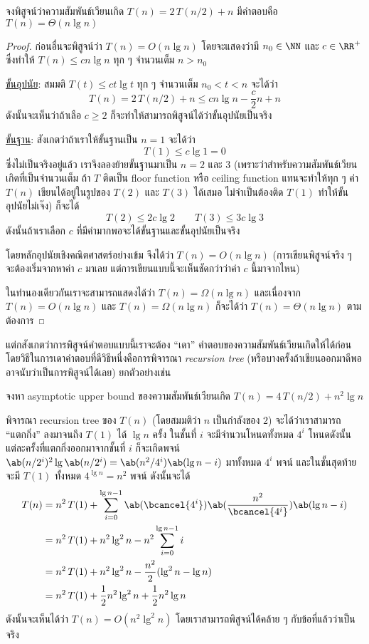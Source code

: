 \begin{exbox}
	จงพิสูจน์ว่าความสัมพันธ์เวียนเกิด $T(n) = 2\, T(n/2) + n$ มีคำตอบคือ $T(n) = \Theta(n\lg n)$
\end{exbox}
\begin{proof}
	ก่อนอื่นจะพิสูจน์ว่า $T(n) = O(n\lg n)$ โดยจะแสดงว่ามี $n_0 \in \NN$ และ $c \in \RR^+$ ซึ่งทำให้ $T(n) \leq cn\lg n$ ทุก ๆ จำนวนเต็ม $n > n_0$
	
	\underline{ขั้นอุปนัย}: สมมติ $T(t) \leq ct\lg t$ ทุก ๆ จำนวนเต็ม $n_0 < t < n$ จะได้ว่า
	\[
		T(n) = 2\,T(n/2) + n \leq cn\lg n - \frac{c}{2}n + n
	\]
	ดังนั้นจะเห็นว่าถ้าเลือ $c \geq 2$ ก็จะทำให้สามารถพิสูจน์ได้ว่าขั้นอุปนัยเป็นจริง
	
	\underline{ขั้นฐาน}: สังเกตว่าถ้าเราให้ขั้นฐานเป็น $n = 1$ จะได้ว่า
	\[
		T(1) \leq c\lg 1 = 0
	\]
	ซึ่งไม่เป็นจริงอยู่แล้ว เราจึงลองย้ายขั้นฐานมาเป็น $n = 2$ และ $3$ (เพราะว่าสำหรับความสัมพันธ์เวียนเกิดที่เป็นจำนวนเต็ม ถ้า $T$ ติดเป็น floor function หรือ ceiling function แทนจะทำให้ทุก ๆ ค่า $T(n)$ เขียนได้อยู่ในรูปของ $T(2)$ และ $T(3)$ ได้เสมอ ไม่จำเป็นต้องติด $T(1)$ ทำให้ขั้นอุปนัยไม่เจ๊ง) ก็จะได้
	\[
		T(2) \leq 2c\lg 2 \qquad T(3) \leq 3c\lg 3
	\]
	ดังนั้นถ้าเราเลือก $c$ ที่มีค่ามากพอจะได้ขั้นฐานและขั้นอุปนัยเป็นจริง
	
	โดยหลักอุปนัยเชิงคณิตศาสตร์อย่างเข้ม จึงได้ว่า $T(n) = O(n\lg n)$ (การเขียนพิสูจน์จริง ๆ จะต้องเริ่มจากหาค่า $c$ มาเลย แต่การเขียนแบบนี้จะเห็นชัดกว่าว่าค่า $c$ นี้มาจากไหน)
	
	ในทำนองเดียวกันเราจะสามารถแสดงได้ว่า $T(n) = \Omega(n\lg n)$ และเนื่องจาก $T(n) = O(n\lg n)$ และ $T(n) = \Omega(n\lg n)$ ก็จะได้ว่า $T(n) = \Theta(n\lg n)$ ตามต้องการ
\end{proof}

แต่กสังเกตว่าการพิสูจน์คำตอบแบบนี้เราจะต้อง ``เดา'' คำตอบของความสัมพันธ์เวียนเกิดให้ได้ก่อน โดยวิธีในการเดาคำตอบที่ดีวิธีหนึ่งคือการพิจารณา \emph{recursion tree} (หรือบางครั้งถ้าเขียนออกมาดีพอ อาจนับว่าเป็นการพิสูจน์ได้เลย) ยกตัวอย่างเช่น

\begin{exbox}
	จงหา asymptotic upper bound ของความสัมพันธ์เวียนเกิด $T(n) = 4\,T(n/2) + n^2\lg n$
\end{exbox}
\begin{soln}
	พิจารณา recursion tree ของ $T(n)$ (โดยสมมติว่า $n$ เป็นกำลังของ $2$) จะได้ว่าเราสามารถ ``แตกกิ่ง'' ลงมาจนถึง $T(1)$ ได้ $\lg n$ ครั้ง ในชั้นที่ $i$ จะมีจำนวนโหนดทั้งหมด $4^i$ โหนดดังนั้นแต่ละครั้งที่แตกกิ่งออกมาจากชั้นที่ $i$ ก็จะเกิดพจน์ $\ab(n/2^i)^2\lg\ab(n/2^i) = \ab(n^2/4^i)\ab(\lg n - i)$ มาทั้งหมด $4^i$ พจน์ และในชั้นสุดท้ายจะมี $T(1)$ ทั้งหมด $4^{\lg n} = n^2$ พจน์ ดังนั้นจะได้
	\begin{align*}
		T(n) &= n^2\,T(1) + \sum_{i=0}^{\lg n-1}\ab(\bcancel{4^i})\ab(\frac{n^2}{\bcancel{4^i}})\ab(\lg n - i)\\
		&= n^2\,T(1) + n^2\lg^2 n - n^2\sum_{i=0}^{\lg n-1}i\\
		&= n^2\,T(1) + n^2\lg^2 n - \frac{n^2}{2}(\lg^2 n - \lg n)\\
		&= n^2\,T(1) + \frac{1}{2}n^2\lg^2 n + \frac{1}{2}n^2\lg n
	\end{align*}
	ดังนั้นจะเห็นได้ว่า $T(n) = O(n^2\lg^2 n)$ โดยเราสามารถพิสูจน์ได้คล้าย ๆ กับข้อที่แล้วว่าเป็นจริง
\end{soln}

